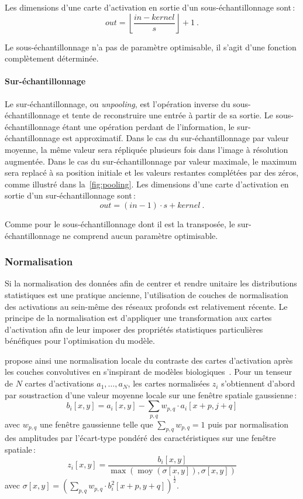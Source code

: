 Les dimensions d'une carte d'activation en sortie d'un sous-échantillonnage sont\,:
$$\mathit{out} = \left\lfloor \frac{\mathit{in} - \mathit{kernel}}{\mathit{s}}\right\rfloor + 1~.$$

Le sous-échantillonnage n'a pas de paramètre optimisable, il s'agit d'une fonction complètement déterminée.

\paragraph{Sur-échantillonnage}

Le sur-échantillonnage, ou \emph{unpooling}, est l'opération inverse du sous-échantillonnage et tente de reconstruire une entrée à partir de sa sortie. Le sous-échantillonnage étant une opération perdant de l'information, le sur-échantillonnage est approximatif. Dans le cas du sur-échantillonnage par valeur moyenne, la même valeur sera répliquée plusieurs fois dans l'image à résolution augmentée. Dans le cas du sur-échantillonnage par valeur maximale, le maximum sera replacé à sa position initiale et les valeurs restantes complétées par des zéros, comme illustré dans la~\cref{fig:pooling}.
Les dimensions d'une carte d'activation en sortie d'un sur-échantillonnage sont\,:
$$\mathit{out} = (\mathit{in} - 1) \cdot \mathit{s} + \mathit{kernel}~.$$

Comme pour le sous-échantillonnage dont il est la transposée, le sur-échantillonnage ne comprend aucun paramètre optimisable.

\subsubsection{Normalisation}

Si la normalisation des données afin de centrer et rendre unitaire les distributions statistiques est une pratique ancienne, l'utilisation de couches de normalisation des activations au sein-même des réseaux profonds est relativement récente. Le principe de la normalisation est d'appliquer une transformation aux cartes d'activation afin de leur imposer des propriétés statistiques particulières bénéfiques pour l'optimisation du modèle.

\citet{jarrett_what_2009} propose ainsi une normalisation locale du contraste des cartes d'activation après les couches convolutives en s'inspirant de modèles biologiques~\cite{pinto_why_2008}. Pour un tenseur de $N$ cartes d'activations $a_1,\dots,a_N$, les cartes normalisées $z_i$ s'obtiennent d'abord par soustraction d'une valeur moyenne locale sur une fenêtre spatiale gaussienne\,:
$$b_i[x,y] = a_i[x,y] - \sum_{p,q} w_{p,q} \cdot a_i[x+p,j+q]$$ avec $w_{p,q}$ une fenêtre gaussienne telle que $\sum_{p,q} w_{p,q} = 1$
puis par normalisation des amplitudes par l'écart-type pondéré des caractéristiques sur une fenêtre spatiale\,:
$$z_i[x,y] = \frac{b_i[x,y]}{\max(\operatorname{moy}(\sigma[x,y]), \sigma[x,y])}$$ avec $\sigma[x,y] = \left(\sum_{p,q} w_{p,q} \cdot b_i^2[x+p,y+q] \right)^{\frac{1}{2}}$.

